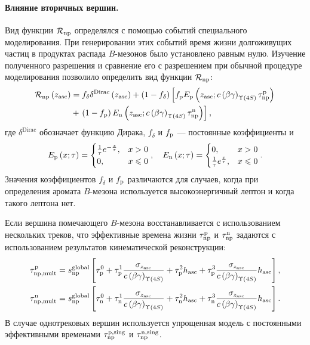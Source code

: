\paragraph{Влияние вторичных вершин. } Вид функции $\mathcal{R}_{\mathrm{np}}$ определялся с помощью событий специального моделирования.  При генерировании этих событий время жизни долгоживущих частиц в продуктах распада $B$-мезонов было установлено равным нулю.  Изучение полученного разрешения и сравнение его с разрешением при обычной процедуре моделирования позволило определить вид функции $\mathcal{R}_{\mathrm{np}}$:
\begin{equation}
 \begin{split}
  \mathcal{R}_{\mathrm{np}}\left( z_{\mathrm{asc}} \right) & = f_{\delta}\delta^{\mathrm{Dirac}} \left( z_{\mathrm{asc}} \right) 
  + \left( 1 - f_{\delta} \right) \left[ f_{\mathrm{p}} E_{\mathrm{p}}\left( z_{\mathrm{asc}};c\left( \beta\gamma \right)_{\Upsilon\left(4S\right)}\tau_{\mathrm{np}}^{\mathrm{p}} \right)\right. \\
  &                      + \left.\left( 1-f_{\mathrm{p}} \right) E_{\mathrm{n}}\left( z_{\mathrm{asc}};c\left( \beta\gamma \right)_{\Upsilon\left(4S\right)}\tau_{\mathrm{np}}^{\mathrm{n}} \right) \right],
 \end{split}
\end{equation}
где $\delta^{\mathrm{Dirac}}$ обозначает функцию Дирака, $f_{\delta}$ и $f_{\mathrm{p}}$ --- постоянные коэффициенты и
\begin{equation}
 E_{\mathrm{p}}\left( x;\tau\right) = 
 \begin{cases}
  \frac{1}{\tau}e^{-\frac{x}{\tau}}, & x>0     \\
  0,                                 & x\leqslant 0
 \end{cases}
 ,\quad
 E_{\mathrm{n}}\left( x;\tau\right) = 
 \begin{cases}
  0,                                 & x>0    \\
  \frac{1}{\tau}e^{\frac{x}{\tau}},  & x\leqslant 0
 \end{cases}
 .
\end{equation}
Значения коэффициентов $f_{\delta}$ и $f_{\mathrm{p}}$ различаются для случаев, когда при определения аромата $B$-мезона используется высокоэнергичный лептон и когда такого лептона нет.

Если вершина помечающего $B$-мезона восстанавливается с использованием нескольких треков, что эффективные времена жизни $\tau_{\mathrm{np}}^{\mathrm{p}}$ и $\tau_{\mathrm{np}}^{\mathrm{n}}$ задаются с использованием результатов кинематической реконструкции:
\begin{equation}
 \begin{split}
  & \tau_{\mathrm{np},\mathrm{mult}}^{\mathrm{p}} = s_{\mathrm{np}}^{\mathrm{global}}\left[
     \tau_{\mathrm{p}}^{0}
   + \tau_{\mathrm{p}}^{1} \frac{\sigma_{z_{\mathrm{asc}}}}{c\left( \beta\gamma \right)_{\Upsilon\left(4S\right)}} 
   + \tau_{\mathrm{p}}^{2} h_{\mathrm{asc}}
   + \tau_{\mathrm{p}}^{3} \frac{\sigma_{z_{\mathrm{asc}}}}{c\left( \beta\gamma \right)_{\Upsilon\left(4S\right)}} h_{\mathrm{asc}}
   \right],\\
  & \tau_{\mathrm{np},\mathrm{mult}}^{\mathrm{n}} = s_{\mathrm{np}}^{\mathrm{global}}\left[
     \tau_{\mathrm{n}}^{0}
   + \tau_{\mathrm{n}}^{1} \frac{\sigma_{z_{\mathrm{asc}}}}{c\left( \beta\gamma \right)_{\Upsilon\left(4S\right)}} 
   + \tau_{\mathrm{n}}^{2} h_{\mathrm{asc}}
   + \tau_{\mathrm{n}}^{3} \frac{\sigma_{z_{\mathrm{asc}}}}{c\left( \beta\gamma \right)_{\Upsilon\left(4S\right)}} h_{\mathrm{asc}}
   \right].
 \end{split}
\end{equation}
В случае однотрековых вершин используется упрощенная модель с постоянными эффективными временами $\tau_{\mathrm{np}}^{\mathrm{p},\mathrm{sing}}$ и $\tau_{\mathrm{np}}^{\mathrm{n},\mathrm{sing}}$.  

